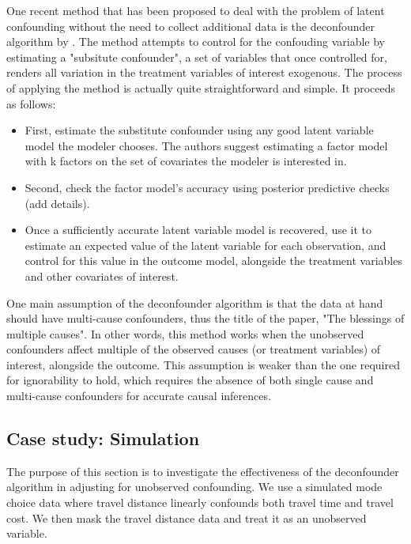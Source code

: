 One recent method that has been proposed to deal with the problem of latent 
confounding without the need to collect additional data is the deconfounder 
algorithm by \citet{wang_2019_blessings}. The method attempts to control for the 
confouding variable by estimating a "subsitute confounder", a set of variables 
that once controlled for, renders all variation in the treatment variables of 
interest exogenous. The process of applying the method is actually quite 
straightforward and simple. It proceeds as follows:
\begin{itemize}
	\item First, estimate the substitute confounder using any good latent variable 
	model the modeler chooses. The authors suggest estimating a factor model 
	with k factors on the set of covariates the modeler is interested in. 
	\item Second, check the factor model's accuracy using posterior predictive 
	checks (add details). 
	\item Once a sufficiently accurate latent variable model is recovered, use it 
	to estimate an expected value of the latent variable for each observation, 
	and control for this value in the outcome model, alongside the treatment 
	variables and other covariates of interest. 
\end{itemize}



One main assumption of the deconfounder algorithm is that the data at hand 
should have multi-cause confounders, thus the title of the paper, "The 
blessings of multiple causes". In other words, this method works when the 
unobserved confounders affect multiple of the observed causes (or treatment 
variables) of interest, alongside the outcome. This assumption is weaker than 
the one required for ignorability to hold, which requires the absence of both 
single cause and multi-cause confounders for accurate causal inferences. 



\subsection{Case study: Simulation}
\label{sec:deconfounder-simulation}

The purpose of this section is to investigate the effectiveness of the 
deconfounder algorithm \citep{wang_2019_blessings} in adjusting for unobserved 
confounding. We use a simulated mode choice data where travel distance 
linearly confounds both travel time and travel cost. We then mask the travel 
distance data and treat it as an unobserved variable. 


